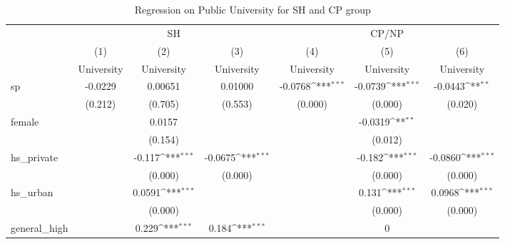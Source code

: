 \documentclass[]{AEA}
\def\sym#1{\ifmmode^{#1}\else\(^{#1}\)\fi}
\begin{document}
    \begin{center}
    \begin{table}
    \caption{Regression on Public University for SH and CP group}
    \setlength{\tabcolsep}{0.5mm}
    \begin{tabular}{l*{6}c}
    \toprule
    &\multicolumn{3}{c}{SH} &\multicolumn{3}{c}{CP/NP} \\
    \cmidrule(l){2-4}\cmidrule(l){5-7}
    &\multicolumn{1}{c}{(1)}&\multicolumn{1}{c}{(2)}&\multicolumn{1}{c}{(3)}&\multicolumn{1}{c}{(4)}&\multicolumn{1}{c}{(5)}&\multicolumn{1}{c}{(6)} \\
    &\multicolumn{1}{c}{University}&\multicolumn{1}{c}{University}&\multicolumn{1}{c}{University}&\multicolumn{1}{c}{University}&\multicolumn{1}{c}{University}&\multicolumn{1}{c}{University} \\
    \midrule
    sp          &     -0.0229         &     0.00651         &     0.01000         &     -0.0768\sym{***}&     -0.0739\sym{***}&     -0.0443\sym{**} \\
            &     (0.212)         &     (0.705)         &     (0.553)         &     (0.000)         &     (0.000)         &     (0.020)         \\
    [1em]
    female      &                     &      0.0157         &                     &                     &     -0.0319\sym{**} &                     \\
                &                     &     (0.154)         &                     &                     &     (0.012)         &                     \\
    [1em]
    hs\_private  &                     &      -0.117\sym{***}&     -0.0675\sym{***}&                     &      -0.182\sym{***}&     -0.0860\sym{***}\\
                &                     &     (0.000)         &     (0.000)         &                     &     (0.000)         &     (0.000)         \\
    [1em]
    hs\_urban    &                     &      0.0591\sym{***}&                     &                     &       0.131\sym{***}&      0.0968\sym{***}\\
                &                     &     (0.000)         &                     &                     &     (0.000)         &     (0.000)         \\
    [1em]
    general\_high&                     &       0.229\sym{***}&       0.184\sym{***}&                     &           0         &                     \\

\end{tabular}
\end{table}
\end{center}
\end{document}
